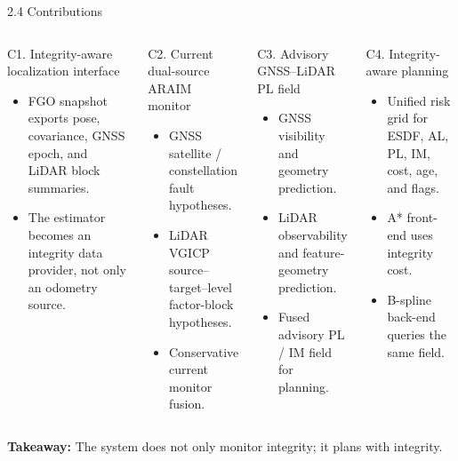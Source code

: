 \documentclass[10pt,aspectratio=169,xcolor=dvipsnames]{beamer}
\newcommand{\tightitem}{\setlength{\itemsep}{2pt}\setlength{\parskip}{0pt}\setlength{\parsep}{0pt}}
\begin{document}
\begin{frame}[t]{2.4 Contributions}
  \small
  \begin{columns}[T]
    \begin{block}{C1. Integrity-aware localization interface}
      \begin{itemize}\tightitem
        \item FGO snapshot exports pose, covariance, GNSS epoch, and LiDAR block summaries.
        \item The estimator becomes an integrity data provider, not only an odometry source.
      \end{itemize}
    \end{block}
    \begin{block}{C2. Current dual-source ARAIM monitor}
      \begin{itemize}\tightitem
        \item GNSS satellite / constellation fault hypotheses.
        \item LiDAR VGICP source--target--level factor-block hypotheses.
        \item Conservative current monitor fusion.
      \end{itemize}
    \end{block}

    \begin{block}{C3. Advisory GNSS--LiDAR PL field}
      \begin{itemize}\tightitem
        \item GNSS visibility and geometry prediction.
        \item LiDAR observability and feature-geometry prediction.
        \item Fused advisory PL / IM field for planning.
      \end{itemize}
    \end{block}
    \begin{block}{C4. Integrity-aware planning}
      \begin{itemize}\tightitem
        \item Unified risk grid for ESDF, AL, PL, IM, cost, age, and flags.
        \item A* front-end uses integrity cost.
        \item B-spline back-end queries the same field.
      \end{itemize}
    \end{block}
  \end{columns}
  \vspace{1mm}
  {\centering\color{ForestGreen}\textbf{Takeaway:} The system does not only monitor integrity; it plans with integrity.\par}
\end{frame}
\end{document}

